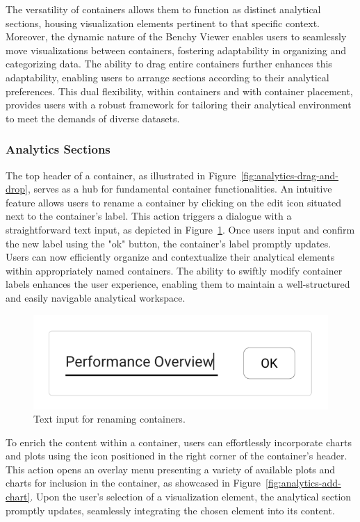 The versatility of containers allows them to function as distinct analytical sections, housing visualization elements pertinent to that specific context. Moreover, the dynamic nature of the Benchy Viewer enables users to seamlessly move visualizations between containers, fostering adaptability in organizing and categorizing data. The ability to drag entire containers further enhances this adaptability, enabling users to arrange sections according to their analytical preferences. This dual flexibility, within containers and with container placement, provides users with a robust framework for tailoring their analytical environment to meet the demands of diverse datasets.

\subsubsection{Analytics Sections}

The top header of a container, as illustrated in Figure~\ref{fig:analytics-drag-and-drop}, serves as a hub for fundamental container functionalities. An intuitive feature allows users to rename a container by clicking on the edit icon situated next to the container's label. This action triggers a dialogue with a straightforward text input, as depicted in Figure~\ref{fig:analytics-section-rename}. Once users input and confirm the new label using the "ok" button, the container's label promptly updates.\\
Users can now efficiently organize and contextualize their analytical elements within appropriately named containers. The ability to swiftly modify container labels enhances the user experience, enabling them to maintain a well-structured and easily navigable analytical workspace.

\begin{figure}[h]
  \centering
  \includegraphics[width=0.25\linewidth]{figures/analytics-section-rename.png}
  \caption{Text input for renaming containers.}
  \label{fig:analytics-section-rename}
\end{figure}

To enrich the content within a container, users can effortlessly incorporate charts and plots using the icon positioned in the right corner of the container's header. This action opens an overlay menu presenting a variety of available plots and charts for inclusion in the container, as showcased in Figure~\ref{fig:analytics-add-chart}. Upon the user's selection of a visualization element, the analytical section promptly updates, seamlessly integrating the chosen element into its content.

